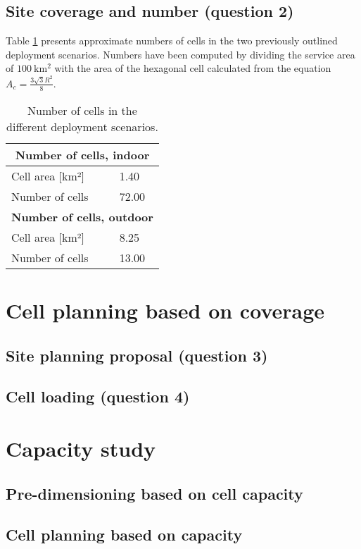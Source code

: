 \documentclass{article}
\begin{document}
\subsection{Site coverage and number (question 2)}

Table \ref{tab:cell_numbers} presents approximate numbers of cells in the two previously outlined deployment scenarios. Numbers have been computed by dividing the service area of \(\SI{100}{\kilo\metre\squared}\) with the area of the hexagonal cell calculated from the equation \(A_c = \frac{3 \sqrt{3} R^2}{8} \).

\begin{table}[!htb]
    \centering
    \begin{tabular}{|l|l|}
    \hline
    \multicolumn{2}{|c|}{\textbf{Number of cells, indoor}} \\ \hline
    Cell area {[}km²{]}                    & 1.40                                        \\ \hline
    Number of cells                        & 72.00                                       \\ \hline
    \multicolumn{2}{|c|}{\textbf{Number of cells, outdoor}} \\ \hline
    Cell area {[}km²{]}                    & 8.25                                        \\ \hline
    Number of cells                        & 13.00                                       \\ \hline
    \end{tabular}
    \caption{Number of cells in the different deployment scenarios.}
    \label{tab:cell_numbers}
\end{table}

\section{Cell planning based on coverage}
\subsection{Site planning proposal (question 3)}
\subsection{Cell loading (question 4)}
\section{Capacity study}
\subsection{Pre-dimensioning based on cell capacity}
\subsection{Cell planning based on capacity}
\end{document}
